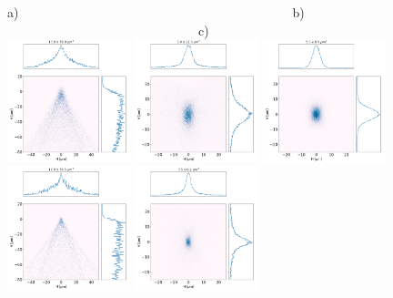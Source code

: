 \documentclass{iucr}              %
\begin{document}
\begin{figure}[h]
\flushleft
a)~~~~~~~~~~~~~~~~~~~~~~~~~~~~~~~~~~~~~~~~~~~b)~~~~~~~~~~~~~~~~~~~~~~~~~~~~~~~~~~~~~~~~~~~c)\\
\centering
\includegraphics[width=0.32\textwidth]{figures/M0p2_toroid.png}
\includegraphics[width=0.32\textwidth]{figures/M0p2_parabolic-cone.png}
\includegraphics[width=0.32\textwidth]{figures/M0p2_diaboloid.png}
\includegraphics[width=0.32\textwidth]{figures/M0p1_toroid.png}
\includegraphics[width=0.32\textwidth]{figures/M0p1_parabolic-cone.png}

\end{figure}
\end{document}
